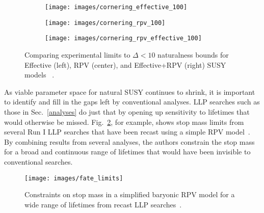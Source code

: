 \documentclass[12pt]{article}
\begin{document}
        \noindent \begin{figure}[htbp] \begin{center}
        \begin{subfigure}[htbp]{0.32\textwidth} \begin{center}
        \texttt{[image: images/cornering\_effective\_100]}
        \end{center} \end{subfigure}
        \begin{subfigure}[htbp]{0.32\textwidth} \begin{center}
        \texttt{[image: images/cornering\_rpv\_100]}
        \end{center} \end{subfigure}
        \begin{subfigure}[htbp]{0.32\textwidth} \begin{center}
        \texttt{[image: images/cornering\_rpv\_effective\_100]}
        \end{center} \end{subfigure}
            \caption{Comparing experimental limits to $\Delta < 10$ naturalness bounds for Effective (left), RPV (center), and Effective+RPV (right) SUSY models ~\cite{cornering}.}
        \label{cornering_limits}
        \end{center} \end{figure}

    As viable parameter space for natural SUSY continues to shrink, it is important to identify and fill in the gaps left by conventional analyses. LLP searches such as those in Sec.~\ref{analyses} do just that by opening up sensitivity to lifetimes that would otherwise be missed. Fig.~\ref{fate_limits}, for example, shows stop mass limits from several Run I LLP searches that have been recast using a simple RPV model~\cite{fate}. By combining results from several analyses, the authors constrain the stop mass for a broad and continuous range of lifetimes that would have been invisible to conventional searches. 

        \noindent \begin{figure}[htbp] \begin{center}
        \texttt{[image: images/fate\_limits]}
        \caption{Constraints on stop mass in a simplified baryonic RPV model for a wide range of lifetimes from recast LLP searches~\cite{fate}.}
        \label{fate_limits}
        \end{center} \end{figure}
\end{document}
